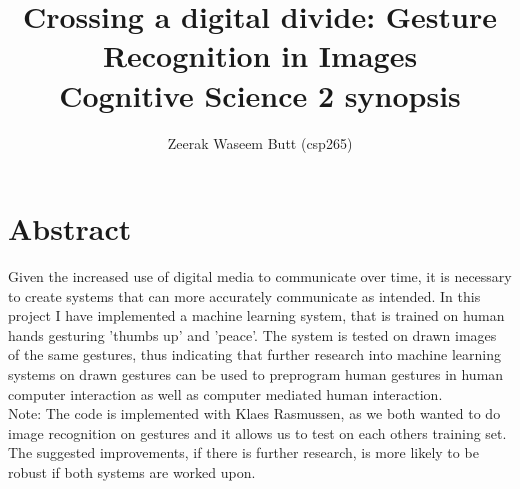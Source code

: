 \documentclass[11pt, a4paper]{article}
\begin{document}
\sloppy
\title{Crossing a digital divide: Gesture Recognition in Images\\\large Cognitive Science 2 synopsis}
\author{Zeerak Waseem Butt (csp265)}
\maketitle
\section{Abstract}
Given the increased use of digital media to communicate over time, it is necessary to create systems that can more accurately communicate as intended. In this project I have implemented a machine learning system, that is trained on human hands gesturing 'thumbs up' and 'peace'. The system is tested on drawn images of the same gestures, thus indicating that further research into machine learning systems on drawn gestures can be used to preprogram human gestures in human computer interaction as well as computer mediated human interaction.\\

Note: The code is implemented with Klaes Rasmussen, as we both wanted to do image recognition on gestures and it allows us to test on each others training set. The suggested improvements, if there is further research, is more likely to be robust if both systems are worked upon.\\
\end{document}
